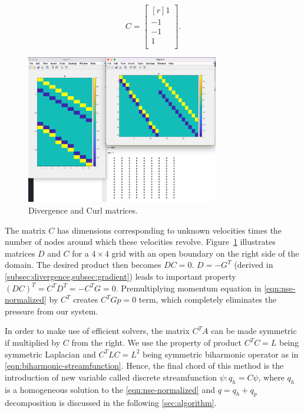 \documentclass{article}
\numberwithin{equation}{section}
\begin{document}
\begin{equation*}
  C = 
  \begin{bmatrix*}[r]
  1		\\
  -1	\\
  -1	\\
  1		\\
\end{bmatrix*}.
\end{equation*}

\begin{figure}[H]
\begin{center}
  \includegraphics[width=0.75\textwidth]{Figures/D-C-DC}
\end{center}
\caption{Divergence and Curl matrices.}
\label{fig:DC}
\end{figure}
The matrix $C$ has dimensions corresponding to unknown velocities times the number of nodes around which these velocities revolve. Figure~\ref{fig:DC} illustrates matrices $D$ and $C$ for a $4\times4$ grid with an open boundary on the right side of the domain. 
The desired product then becomes $DC=0$. $D=-G^T$ (derived in \cref{subsec:divergence,subsec:gradient}) leads to important property $(DC)^T=C^TD^T=-C^TG=0$. Premultiplying momentum equation in \cref{eqn:nse-normalized} by $C^T$ creates $C^TGp=0$ term, which completely eliminates the pressure from our system.

In order to make use of efficient solvers, the matrix $C^TA$ can be made symmetric if multiplied by $C$ from the right. We use the property of product $C^TC=L$ being symmetric Laplacian and $C^TLC=L^2$ being symmetric biharmonic operator as in \cref{eqn:biharmonic-streamfunction}. 
Hence, the final chord of this method is the introduction of new variable called discrete streamfunction $\psi:q_h=C\psi$, where $q_h$ is a homogeneous solution to the \cref{eqn:nse-normalized} and $q=q_h+q_p$ decomposition is discussed in the following \cref{sec:algorithm}.
\end{document}
